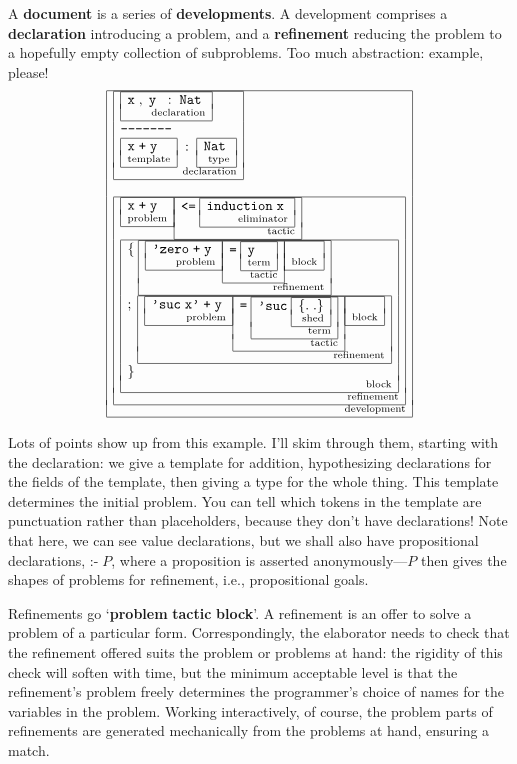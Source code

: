 \documentclass{article}
\begin{document}
A \textbf{document} is a series of \textbf{developments}. A
development comprises a \textbf{declaration} introducing a problem,
and a \textbf{refinement} reducing the problem to a hopefully
empty collection of subproblems. Too much abstraction: example, please!
\newcommand{\capbox}[2]{\raisebox{0.12in}{\begin{array}[t]{|l|}\hline
      #1 \vspace*{-0.05in}\\
    \hfill\mbox{\scriptsize{#2}} \\ \hline\end{array}}}
\newcommand{\Ts}[1]{\texttt{#1}\;}
\newcommand{\co}{\;:\;}
\newcommand{\sco}{;\;\;}
\newcommand{\cm}{,\;}
\[
\capbox{
  \capbox{
    \capbox{\Ts{x} \cm \Ts{y}\co \Ts{Nat}}{declaration}\\
    \Ts{--------------}\\
    \capbox{\Ts{x} \Ts{+} \Ts{y}}{template} \co \capbox{\Ts{Nat}}{type}
    }
    {declaration}\\ \\
  \capbox{
     \capbox{\Ts{x}\Ts{+}\Ts{y}}{problem}
       \capbox{\Ts{<=}\capbox{\Ts{induction}\Ts{x}}{eliminator}}{tactic}\\
     \capbox{
      \{\;\capbox{\capbox{\Ts{'zero}\Ts{+}\Ts{y}}{problem}
                  \capbox{\Ts{=} \capbox{\Ts{y}}{term}}{tactic}
                  \capbox{}{block}
          }{refinement}\\
      ;\;\capbox{\capbox{\Ts{'suc}\Ts{x'}\Ts{+}\Ts{y}}{problem}
                 \capbox{\Ts{=} \capbox{\Ts{'suc}
                   \capbox{\{.\;.\}}{shed}}{term}}{tactic}
                  \capbox{}{block}
         }{refinement}\\
      \}
      }{block}
    }
    {refinement}}
    {development}
\]

Lots of points show up from this example. I'll skim through them,
starting with the declaration: we give a template for addition,
hypothesizing declarations for the fields of the template, then giving
a type for the whole thing. This template determines the initial
problem. You can tell which tokens in the template are punctuation
rather than placeholders, because they don't have declarations!
Note that here, we can see value declarations, but we shall also have
propositional declarations, \(\texttt{:-}\;P\), where a proposition is
asserted anonymously---\(P\) then gives the shapes of problems for
refinement, i.e., propositional goals.

Refinements go `\textbf{problem} \textbf{tactic} \textbf{block}'. A
refinement is an offer to solve a problem of a particular form.
Correspondingly, the elaborator needs to check that the refinement
offered suits the problem or problems at hand: the rigidity of this
check will soften with time, but the minimum acceptable level is that
the refinement's problem freely determines the programmer's choice of
names for the variables in the problem. Working interactively, of course,
the problem parts of refinements are generated mechanically from the
problems at hand, ensuring a match.
\end{document}
